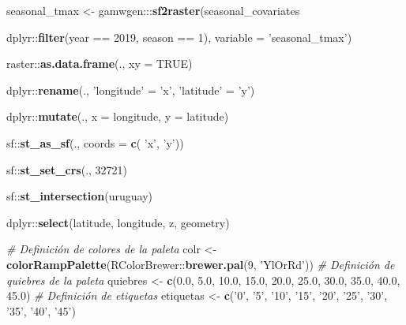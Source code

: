 \documentclass[
  12pt]{article}
\newenvironment{Shaded}{}{}
\newcommand{\CommentTok}[1]{\textcolor[rgb]{0.38,0.63,0.69}{\textit{#1}}}
\newcommand{\DataTypeTok}[1]{\textcolor[rgb]{0.56,0.13,0.00}{#1}}
\newcommand{\DecValTok}[1]{\textcolor[rgb]{0.25,0.63,0.44}{#1}}
\newcommand{\FloatTok}[1]{\textcolor[rgb]{0.25,0.63,0.44}{#1}}
\newcommand{\KeywordTok}[1]{\textcolor[rgb]{0.00,0.44,0.13}{\textbf{#1}}}
\newcommand{\NormalTok}[1]{#1}
\newcommand{\OperatorTok}[1]{\textcolor[rgb]{0.40,0.40,0.40}{#1}}
\newcommand{\OtherTok}[1]{\textcolor[rgb]{0.00,0.44,0.13}{#1}}
\newcommand{\StringTok}[1]{\textcolor[rgb]{0.25,0.44,0.63}{#1}}
\begin{document}
\begin{Shaded}
\begin{Highlighting}[]
\NormalTok{seasonal_tmax <-}\StringTok{ }\NormalTok{gamwgen}\OperatorTok{:::}\KeywordTok{sf2raster}\NormalTok{(seasonal_covariates }\OperatorTok{%
\StringTok{                                       }\NormalTok{dplyr}\OperatorTok{::}\KeywordTok{filter}\NormalTok{(year }\OperatorTok{==}\StringTok{ }\DecValTok{2019}\NormalTok{, season }\OperatorTok{==}\StringTok{ }\DecValTok{1}\NormalTok{),}
                                     \DataTypeTok{variable =} \StringTok{'seasonal_tmax'}\NormalTok{) }\OperatorTok{%
\StringTok{  }\NormalTok{raster}\OperatorTok{::}\KeywordTok{as.data.frame}\NormalTok{(., }\DataTypeTok{xy =} \OtherTok{TRUE}\NormalTok{) }\OperatorTok{%
\StringTok{  }\NormalTok{dplyr}\OperatorTok{::}\KeywordTok{rename}\NormalTok{(., }\StringTok{'longitude'}\NormalTok{ =}\StringTok{ 'x'}\NormalTok{, }\StringTok{'latitude'}\NormalTok{ =}\StringTok{ 'y'}\NormalTok{) }\OperatorTok{%
\StringTok{  }\NormalTok{dplyr}\OperatorTok{::}\KeywordTok{mutate}\NormalTok{(., }\DataTypeTok{x =}\NormalTok{ longitude, }\DataTypeTok{y =}\NormalTok{ latitude) }\OperatorTok{%
\StringTok{  }\NormalTok{sf}\OperatorTok{::}\KeywordTok{st_as_sf}\NormalTok{(., }\DataTypeTok{coords =} \KeywordTok{c}\NormalTok{( }\StringTok{'x'}\NormalTok{, }\StringTok{'y'}\NormalTok{)) }\OperatorTok{%
\StringTok{  }\NormalTok{sf}\OperatorTok{::}\KeywordTok{st_set_crs}\NormalTok{(., }\DecValTok{32721}\NormalTok{)  }\OperatorTok{%
\StringTok{  }\NormalTok{sf}\OperatorTok{::}\KeywordTok{st_intersection}\NormalTok{(uruguay) }\OperatorTok{%
\StringTok{  }\NormalTok{dplyr}\OperatorTok{::}\KeywordTok{select}\NormalTok{(latitude, longitude, z, geometry)  }

\CommentTok{# Definición de colores de la paleta}
\NormalTok{colr <-}\StringTok{ }\KeywordTok{colorRampPalette}\NormalTok{(RColorBrewer}\OperatorTok{::}\KeywordTok{brewer.pal}\NormalTok{(}\DecValTok{9}\NormalTok{, }\StringTok{'YlOrRd'}\NormalTok{))}
\CommentTok{# Definición de quiebres de la paleta}
\NormalTok{quiebres <-}\StringTok{ }\KeywordTok{c}\NormalTok{(}\FloatTok{0.0}\NormalTok{, }\FloatTok{5.0}\NormalTok{, }\FloatTok{10.0}\NormalTok{, }\FloatTok{15.0}\NormalTok{, }\FloatTok{20.0}\NormalTok{, }\FloatTok{25.0}\NormalTok{, }\FloatTok{30.0}\NormalTok{, }\FloatTok{35.0}\NormalTok{, }\FloatTok{40.0}\NormalTok{, }\FloatTok{45.0}\NormalTok{)}
\CommentTok{# Definición de etiquetas}
\NormalTok{etiquetas <-}\StringTok{ }\KeywordTok{c}\NormalTok{(}\StringTok{'0'}\NormalTok{, }\StringTok{'5'}\NormalTok{, }\StringTok{'10'}\NormalTok{, }\StringTok{'15'}\NormalTok{, }\StringTok{'20'}\NormalTok{, }\StringTok{'25'}\NormalTok{, }\StringTok{'30'}\NormalTok{, }\StringTok{'35'}\NormalTok{, }\StringTok{'40'}\NormalTok{, }\StringTok{'45'}\NormalTok{)}

}}}}}}}}
\end{Highlighting}
\end{Shaded}
\end{document}
